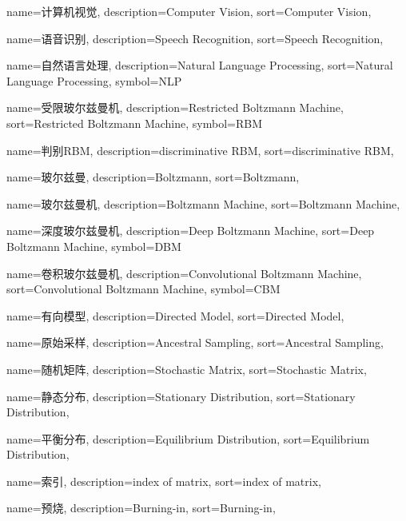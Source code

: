 {
  name=计算机视觉,
  description={Computer Vision},
  sort={Computer Vision},
}

{
  name=语音识别,
  description={Speech Recognition},
  sort={Speech Recognition},
}

{
  name=自然语言处理,
  description={Natural Language Processing},
  sort={Natural Language Processing},
  symbol={NLP}
}

{
  name=受限玻尔兹曼机,
  description={Restricted Boltzmann Machine},
  sort={Restricted Boltzmann Machine},
  symbol={RBM}
}

{
  name=判别RBM,
  description={discriminative RBM},
  sort={discriminative RBM},
}

{
  name=玻尔兹曼,
  description={Boltzmann},
  sort={Boltzmann},
}

{
  name=玻尔兹曼机,
  description={Boltzmann Machine},
  sort={Boltzmann Machine},
}

{
  name=深度玻尔兹曼机,
  description={Deep Boltzmann Machine},
  sort={Deep Boltzmann Machine},
  symbol={DBM}
}

{
  name=卷积玻尔兹曼机,
  description={Convolutional Boltzmann Machine},
  sort={Convolutional Boltzmann Machine},
  symbol={CBM}
}

{
  name=有向模型,
  description={Directed Model},
  sort={Directed Model},
}

{
  name=原始采样,
  description={Ancestral Sampling},
  sort={Ancestral Sampling},
}

{
  name=随机矩阵,
  description={Stochastic Matrix},
  sort={Stochastic Matrix},
}

{
  name=静态分布,
  description={Stationary Distribution},
  sort={Stationary Distribution},
}

{
  name=平衡分布,
  description={Equilibrium Distribution},
  sort={Equilibrium Distribution},
}

{
  name=索引,
  description={index of matrix},
  sort={index of matrix},
}

{
  name=预烧,
  description={Burning-in},
  sort={Burning-in},
}

